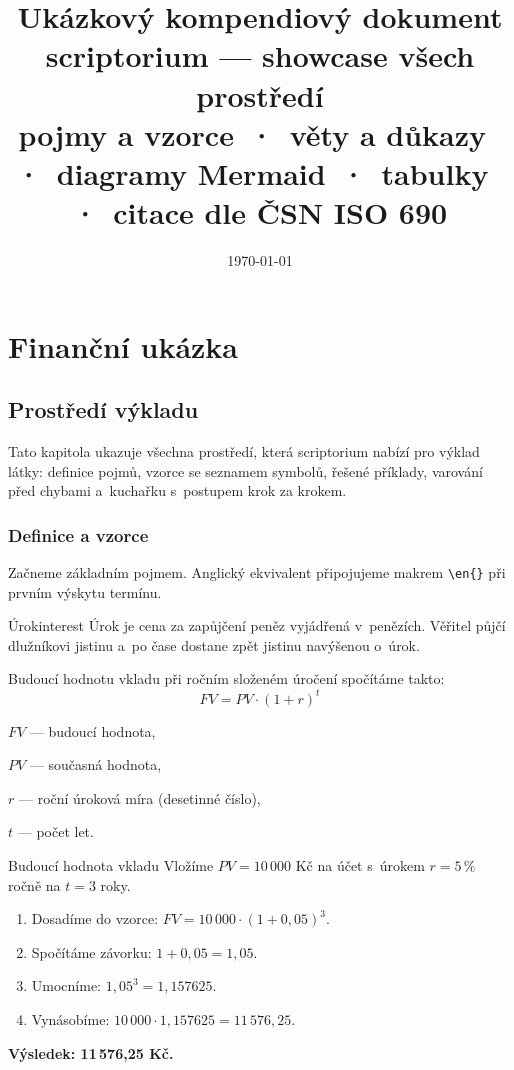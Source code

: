 \documentclass[11pt, a4paper, oneside]{book}
\title{\Huge\bfseries Ukázkový kompendiový dokument\\[0.5em]
       \Large scriptorium — showcase všech prostředí\\[2em]
       \normalsize pojmy a vzorce \,·\, věty a důkazy \,·\, diagramy Mermaid \,·\, tabulky \,·\, citace dle ČSN ISO 690}
\author{}
\date{\today}
\begin{document}
\maketitle
\tableofcontents
\listoffigures
\listoftables
\cleardoublepage

\part{Finanční ukázka}

\chapter{Prostředí výkladu}
\label{ch:vyklad}

Tato kapitola ukazuje všechna prostředí, která scriptorium nabízí pro výklad
látky: definice pojmů, vzorce se seznamem symbolů, řešené příklady, varování
před chybami a~kuchařku s~postupem krok za krokem.

\section{Definice a vzorce}

Začneme základním pojmem. Anglický ekvivalent připojujeme makrem
\verb|\en{}| při prvním výskytu termínu.

\begin{pojem}{Úrok}{interest}
Úrok je cena za zapůjčení peněz vyjádřená v~penězích. Věřitel
půjčí dlužníkovi jistinu a~po čase dostane zpět jistinu navýšenou
o~úrok.
\end{pojem}

Budoucí hodnotu vkladu při ročním složeném úročení spočítáme takto:
\[ FV = PV \cdot (1 + r)^t \]
\begin{kde}
  \item $FV$ — budoucí hodnota,
  \item $PV$ — současná hodnota,
  \item $r$ — roční úroková míra (desetinné číslo),
  \item $t$ — počet let.
\end{kde}

\begin{priklad}{Budoucí hodnota vkladu}
Vložíme $PV = 10\,000$ Kč na účet s~úrokem $r = 5\,\%$ ročně na $t = 3$ roky.
\begin{enumerate}
  \item Dosadíme do vzorce: $FV = 10\,000 \cdot (1 + 0{,}05)^3$.
  \item Spočítáme závorku: $1 + 0{,}05 = 1{,}05$.
  \item Umocníme: $1{,}05^3 = 1{,}157625$.
  \item Vynásobíme: $10\,000 \cdot 1{,}157625 = 11\,576{,}25$.
\end{enumerate}
\textbf{Výsledek: 11\,576,25 Kč.}
\end{priklad}
\end{document}
